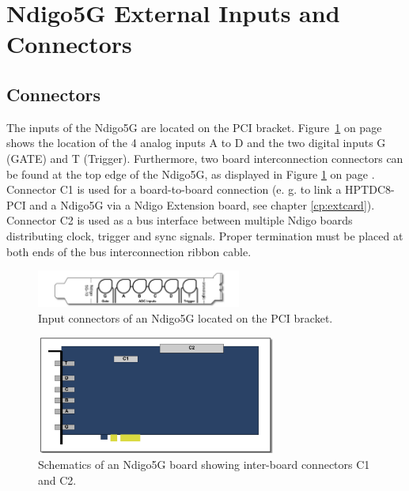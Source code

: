 \section{Ndigo5G External Inputs and Connectors}
\subsection{Connectors}
%
The inputs of the Ndigo5G are located on the PCI bracket. Figure~\ref{fig:schematics} on page~\pageref{fig:schematics} shows the location of the 4 analog inputs A to D and the two digital inputs G (GATE) and T (Trigger). Furthermore, two board interconnection connectors can be found at the top edge of the Ndigo5G, as displayed in  Figure \ref{fig:schematics} on page \pageref{fig:schematics}. Connector C1 is used for a board-to-board connection (e. g. to link a HPTDC8-PCI and a Ndigo5G via a Ndigo Extension board, see chapter \ref{cp:extcard}). Connector C2 is used as a bus interface between multiple Ndigo boards distributing clock, trigger and sync signals. Proper termination must be placed at both ends of the bus interconnection ribbon cable.
%
\begin{figure}[hb]
    \centering
    \includegraphics[width=0.6\textwidth]{figures/Ndigo-Slotblende.pdf}
    \caption{Input connectors of an Ndigo5G located on the PCI bracket.}
\end{figure}
%
\begin{figure}[ht]
    \centering
    \includegraphics[width=0.7\textwidth]{figures/Ndigo_schematic.pdf}
    \caption{Schematics of an Ndigo5G board showing inter-board connectors C1 and C2.\label{fig:schematics}}
\end{figure}
%
%
%
